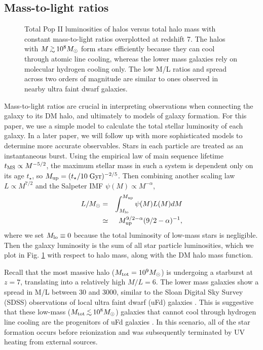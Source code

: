 \documentclass[12pt,preprint]{aastex}
\begin{document}
\subsection{Mass-to-light ratios}


\begin{figure}
\caption{\label{fig:massfn} Total Pop II luminosities of halos versus
  total halo mass with constant mass-to-light ratios overplotted at
  redshift 7.  The halos with $M \gsim 10^8 \Ms$ form stars
  efficiently because they can cool through atomic line cooling,
  whereas the lower mass galaxies rely on molecular hydrogen cooling
  only.  The low M/L ratios and spread across two orders of magnitude
  are similar to ones observed in nearby ultra faint dwarf galaxies.}
\end{figure}


Mass-to-light ratios are crucial in interpreting observations when
connecting the galaxy to its DM halo, and ultimately to models of
galaxy formation.  For this paper, we use a simple model to calculate
the total stellar luminosity of each galaxy.  In a later paper, we
will follow up with more sophisticated models to determine more
accurate observables.  Stars in each particle are treated as an
instantaneous burst.  Using the empirical law of main sequence
lifetime $t_{\rm MS} \propto M^{-5/2}$, the maximum stellar mass in
such a system is dependent only on its age $t_\star$, so $M_{\rm up} =
(t_\star / 10\;\mathrm{Gyr})^{-2/5}$.  Then combining another scaling
law $L \propto M^{7/2}$ and the Salpeter IMF $\psi(M) \propto
M^{-\alpha}$,
%
\begin{eqnarray}
  \label{eqn:lum}
  L/M_\odot &=& \int_{M_{\rm lo}}^{M_{\rm up}} \psi(M) L(M) dM
  \nonumber\\ &\simeq& M_{\rm up}^{9/2-\alpha} (9/2 - \alpha)^{-1},
\end{eqnarray}
where we set $M_{\rm lo} \equiv 0$ because the total luminosity of
low-mass stars is negligible.  Then the galaxy luminosity is the sum
of all star particle luminosities, which we plot in
Fig. \ref{fig:massfn} with respect to halo mass, along with the DM
halo mass function.

Recall that the most massive halo ($M_{\rm tot} = 10^9 \Ms$) is
undergoing a starburst at $z=7$, translating into a relatively high
$M/L = 6$.  The lower mass galaxies show a spread in M/L between 30
and 3000, similar to the Sloan Digital Sky Survey (SDSS) observations
of local ultra faint dwarf (uFd) galaxies \citep[e.g.][]{Strigari08}.
This is suggestive that these low-mass ($M_{\rm tot} \lsim 10^8 \Ms$)
galaxies that cannot cool through hydrogen line cooling are the
progenitors of uFd galaxies \citep{Bovill11a, Bovill11b}.  In this
scenario, all of the star formation occurs before reionization and
was subsequently terminated by UV heating from external sources.
\end{document}
